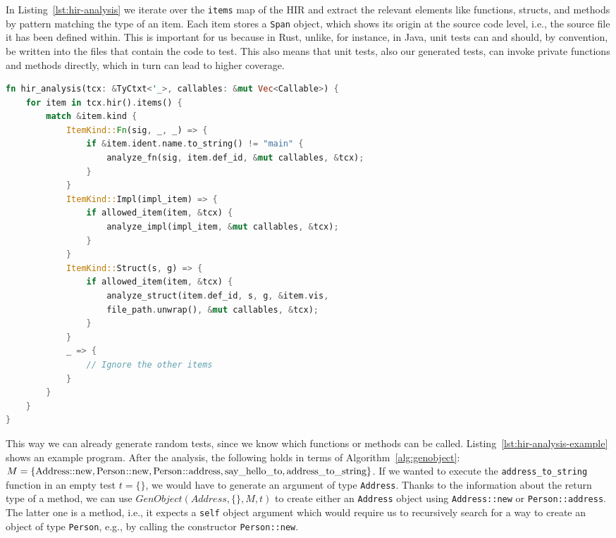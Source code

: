 \documentclass{article}
\begin{document}
In Listing~\ref{lst:hir-analysis} we iterate over the \lstinline{items} map of the \ac{HIR} and extract the relevant elements like functions, structs, and methods by pattern matching the type of an item. Each item stores a \lstinline{Span} object, which shows its origin at the source code level, i.e., the source file it has been defined within. This is important for us because in Rust, unlike, for instance, in Java, unit tests can and should, by convention, be written into the files that contain the code to test. This also means that unit tests, also our generated tests, can invoke private functions and methods directly, which in turn can lead to higher coverage.

\begin{lstlisting}[language=Rust, style=boxed, caption={Iterate over the items in the HIR of a crate}, label=lst:hir-analysis]
fn hir_analysis(tcx: &TyCtxt<'_>, callables: &mut Vec<Callable>) {
    for item in tcx.hir().items() {
        match &item.kind {
            ItemKind::Fn(sig, _, _) => {
                if &item.ident.name.to_string() != "main" {
                    analyze_fn(sig, item.def_id, &mut callables, &tcx);
                }
            }
            ItemKind::Impl(impl_item) => {
                if allowed_item(item, &tcx) {
                    analyze_impl(impl_item, &mut callables, &tcx);
                }
            }
            ItemKind::Struct(s, g) => {
                if allowed_item(item, &tcx) {
                    analyze_struct(item.def_id, s, g, &item.vis,
                    file_path.unwrap(), &mut callables, &tcx);
                }
            }
            _ => {
                // Ignore the other items
            }
        }
    }
}
\end{lstlisting}

This way we can already generate random tests, since we know which functions or methods can be called. Listing~\ref{lst:hir-analysis-example} shows an example program. After the analysis, the following holds in terms of Algorithm~\ref{alg:genobject}: $M = \{\lstinline{Address::new}, \lstinline{Person::new}, \lstinline{Person::address}, \lstinline{say_hello_to}, \lstinline{address_to_string}\}$. If we wanted to execute the \lstinline{address_to_string} function in an empty test $t = \{\}$, we would have to generate an argument of type \lstinline{Address}. Thanks to the information about the return type of a method, we can use $GenObject(Address, \{\}, M, t)$ to create either an \lstinline{Address} object using \lstinline{Address::new} or \lstinline{Person::address}. The latter one is a method, i.e., it expects a \lstinline{self} object argument which would require us to recursively search for a way to create an object of type \lstinline{Person}, e.g., by calling the constructor \lstinline{Person::new}.
\end{document}
